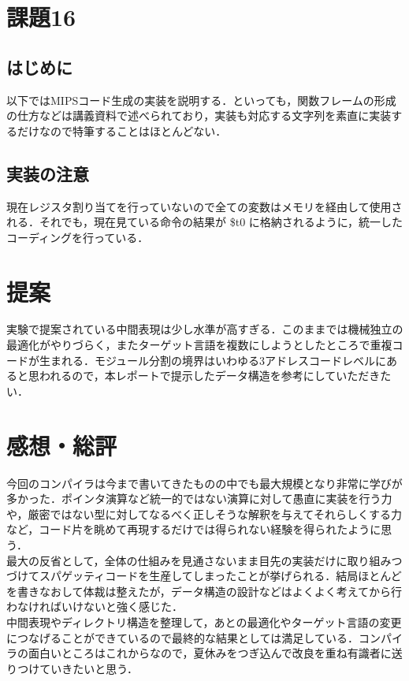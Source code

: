 \documentclass{jsarticle}
\begin{document}
\section{課題16}
\subsection{はじめに}
以下ではMIPSコード生成の実装を説明する．といっても，関数フレームの形成の仕方などは講義資料で述べられており，実装も対応する文字列を素直に実装するだけなので特筆することはほとんどない．

\subsection{実装の注意}
現在レジスタ割り当てを行っていないので全ての変数はメモリを経由して使用される．それでも，現在見ている命令の結果が \$t0 に格納されるように，統一したコーディングを行っている．

\section{提案}
実験で提案されている中間表現は少し水準が高すぎる．このままでは機械独立の最適化がやりづらく，またターゲット言語を複数にしようとしたところで重複コードが生まれる．モジュール分割の境界はいわゆる3アドレスコードレベルにあると思われるので，本レポートで提示したデータ構造を参考にしていただきたい．
\section{感想・総評}
今回のコンパイラは今まで書いてきたものの中でも最大規模となり非常に学びが多かった．ポインタ演算など統一的ではない演算に対して愚直に実装を行う力や，厳密ではない型に対してなるべく正しそうな解釈を与えてそれらしくする力など，コード片を眺めて再現するだけでは得られない経験を得られたように思う．\\
最大の反省として，全体の仕組みを見通さないまま目先の実装だけに取り組みつづけてスパゲッティコードを生産してしまったことが挙げられる．結局ほとんどを書きなおして体裁は整えたが，データ構造の設計などはよくよく考えてから行わなければいけないと強く感じた．\\
中間表現やディレクトリ構造を整理して，あとの最適化やターゲット言語の変更につなげることができているので最終的な結果としては満足している．コンパイラの面白いところはこれからなので，夏休みをつぎ込んで改良を重ね有識者に送りつけていきたいと思う．\\
\end{document}
